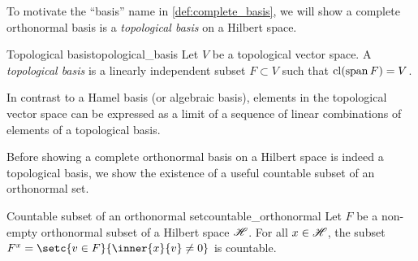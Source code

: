 To motivate the \enquote{basis} name in \cref{def:complete_basis}, we will show a complete orthonormal basis is a \emph{topological basis} on a Hilbert space.
\begin{definition}{Topological basis}{topological_basis}
    Let \(V\) be a topological vector space. A \emph{topological basis} is a linearly independent subset \(F\subset V\) such that \(\operatorname{cl}(\operatorname{span} F) = V\).
\end{definition}
In contrast to a Hamel basis (or algebraic basis), elements in the topological vector space can be expressed as a limit of a sequence of linear combinations of elements of a topological basis.

Before showing a complete orthonormal basis on a Hilbert space is indeed a topological basis, we show the existence of a useful countable subset of an orthonormal set.
\begin{lemma}{Countable subset of an orthonormal set}{countable_orthonormal}
    Let \(F\) be a non-empty orthonormal subset of a Hilbert space \(\mathscr{H}\). For all \(x \in \mathscr{H}\), the subset \(F^x = \setc{v \in F}{\inner{x}{v} \neq 0}\) is countable.
\end{lemma}
